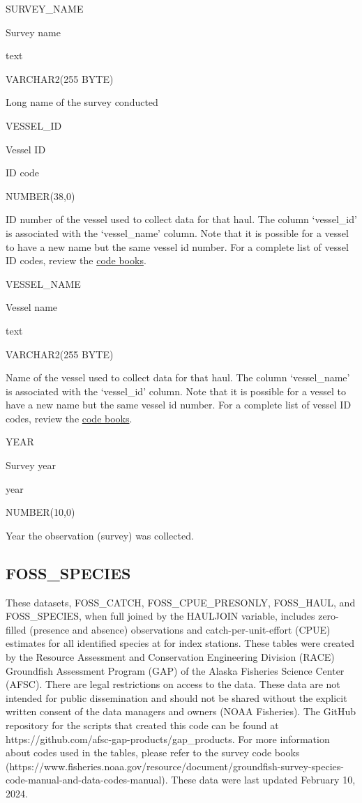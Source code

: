 \documentclass[
  letterpaper,
  oneside,
  open=any]{scrbook}
\begin{document}
SURVEY\_NAME

Survey name

text

VARCHAR2(255 BYTE)

Long name of the survey conducted

VESSEL\_ID

Vessel ID

ID code

NUMBER(38,0)

ID number of the vessel used to collect data for that haul. The column
`vessel\_id' is associated with the `vessel\_name' column. Note that it
is possible for a vessel to have a new name but the same vessel id
number. For a complete list of vessel ID codes, review the
\href{https://www.fisheries.noaa.gov/resource/document/groundfish-survey-species-code-manual-and-data-codes-manual}{code
books}.

VESSEL\_NAME

Vessel name

text

VARCHAR2(255 BYTE)

Name of the vessel used to collect data for that haul. The column
`vessel\_name' is associated with the `vessel\_id' column. Note that it
is possible for a vessel to have a new name but the same vessel id
number. For a complete list of vessel ID codes, review the
\href{https://www.fisheries.noaa.gov/resource/document/groundfish-survey-species-code-manual-and-data-codes-manual}{code
books}.

YEAR

Survey year

year

NUMBER(10,0)

Year the observation (survey) was collected.

\hypertarget{foss_species}{%
\subsection{FOSS\_SPECIES}\label{foss_species}}

These datasets, FOSS\_CATCH, FOSS\_CPUE\_PRESONLY, FOSS\_HAUL, and
FOSS\_SPECIES, when full joined by the HAULJOIN variable, includes
zero-filled (presence and absence) observations and
catch-per-unit-effort (CPUE) estimates for all identified species at for
index stations. These tables were created by the Resource Assessment and
Conservation Engineering Division (RACE) Groundfish Assessment Program
(GAP) of the Alaska Fisheries Science Center (AFSC). There are legal
restrictions on access to the data. These data are not intended for
public dissemination and should not be shared without the explicit
written consent of the data managers and owners (NOAA Fisheries). The
GitHub repository for the scripts that created this code can be found at
https://github.com/afsc-gap-products/gap\_products. For more information
about codes used in the tables, please refer to the survey code books
(https://www.fisheries.noaa.gov/resource/document/groundfish-survey-species-code-manual-and-data-codes-manual).
These data were last updated February 10, 2024.
\end{document}
